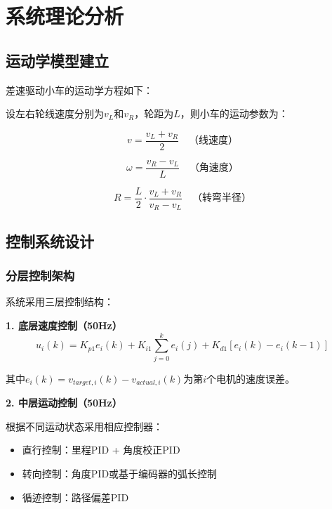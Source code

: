 \documentclass[UTF8]{ctexart}
\begin{document}
\section{系统理论分析}

\subsection{运动学模型建立}

差速驱动小车的运动学方程如下：

设左右轮线速度分别为$v_L$和$v_R$，轮距为$L$，则小车的运动参数为：

\begin{equation}
v = \frac{v_L + v_R}{2} \quad \text{（线速度）}
\end{equation}

\begin{equation}
\omega = \frac{v_R - v_L}{L} \quad \text{（角速度）}
\end{equation}

\begin{equation}
R = \frac{L}{2} \cdot \frac{v_L + v_R}{v_R - v_L} \quad \text{（转弯半径）}
\end{equation}

\subsection{控制系统设计}

\subsubsection{分层控制架构}

系统采用三层控制结构：

\textbf{1. 底层速度控制（50Hz）}
\begin{equation}
u_i(k) = K_{p1} e_i(k) + K_{i1} \sum_{j=0}^{k} e_i(j) + K_{d1} [e_i(k) - e_i(k-1)]
\end{equation}

其中$e_i(k) = v_{target,i}(k) - v_{actual,i}(k)$为第$i$个电机的速度误差。

\textbf{2. 中层运动控制（50Hz）}

根据不同运动状态采用相应控制器：
\begin{itemize}
    \item 直行控制：里程PID + 角度校正PID
    \item 转向控制：角度PID或基于编码器的弧长控制
    \item 循迹控制：路径偏差PID
\end{itemize}
\end{document}
